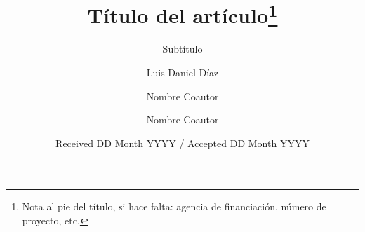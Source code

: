 %

\title{Título del artículo\thanks{Nota al pie del título, si hace falta:
       agencia de financiación, número de proyecto, etc.}}

\subtitle{Subtítulo}

\author{
  Luis Daniel Díaz
  \and Nombre Coautor
  \and Nombre Coautor
}


\date{Received DD Month YYYY / Accepted DD Month YYYY}
